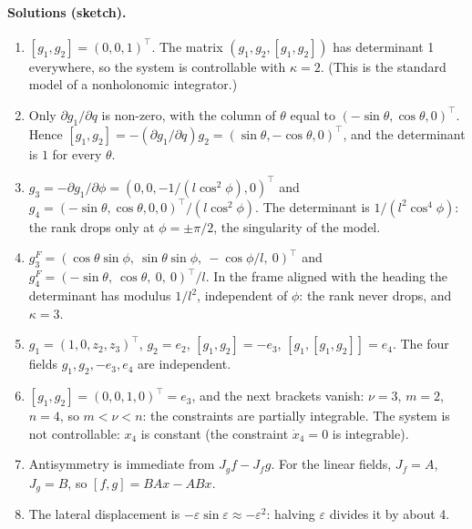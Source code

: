 \paragraph{Solutions (sketch).}
\begin{enumerate}
    \item \( [g_1, g_2] = (0,0,1)^\top \). The matrix
          \( (g_1, g_2, [g_1,g_2]) \) has determinant 1 everywhere, so
          the system is controllable with \( \kappa = 2 \). (This is
          the standard model of a nonholonomic integrator.)
    \item Only \( \partial g_1/\partial q \) is non-zero, with the
          column of \( \theta \) equal to \( (-\sin\theta, \cos\theta,
          0)^\top \). Hence \( [g_1, g_2] = -(\partial g_1/\partial q)
          g_2 = (\sin\theta, -\cos\theta, 0)^\top \), and the
          determinant is \( 1 \) for every \( \theta \).
    \item \( g_3 = -\partial g_1/\partial\phi = (0, 0,
          -1/(l\cos^2\phi), 0)^\top \) and
          \( g_4 = (-\sin\theta, \cos\theta, 0, 0)^\top /
          (l\cos^2\phi) \). The determinant is
          \( 1/(l^2\cos^4\phi) \): the rank drops only at
          \( \phi = \pm\pi/2 \), the singularity of the model.
    \item \( g_3^F = (\cos\theta\sin\phi,\ \sin\theta\sin\phi,\
          -\cos\phi/l,\ 0)^\top \) and
          \( g_4^F = (-\sin\theta,\ \cos\theta,\ 0,\ 0)^\top / l \). In
          the frame aligned with the heading the determinant has
          modulus \( 1/l^2 \), independent of \( \phi \): the rank
          never drops, and \( \kappa = 3 \).
    \item \( g_1 = (1, 0, z_2, z_3)^\top \), \( g_2 = e_2 \),
          \( [g_1, g_2] = -e_3 \), \( [g_1, [g_1, g_2]] = e_4 \). The
          four fields \( g_1, g_2, -e_3, e_4 \) are independent.
    \item \( [g_1, g_2] = (0,0,1,0)^\top = e_3 \), and the next
          brackets vanish: \( \nu = 3 \), \( m = 2 \), \( n = 4 \),
          so \( m < \nu < n \): the constraints are partially
          integrable. The system is not controllable: \( x_4 \) is
          constant (the constraint \( \dot x_4 = 0 \) is integrable).
    \item Antisymmetry is immediate from \( J_g f - J_f g \). For the
          linear fields, \( J_f = A \), \( J_g = B \), so
          \( [f,g] = BAx - ABx \).
    \item The lateral displacement is \( -\varepsilon\sin\varepsilon
          \approx -\varepsilon^2 \): halving \( \varepsilon \) divides
          it by about 4.
\end{enumerate}

